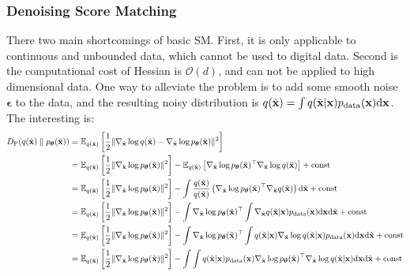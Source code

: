 \documentclass{article}
\begin{document}
\subsubsection{Denoising Score Matching}
There two main shortcomings of basic SM. First, it is only applicable to continuous and unbounded data, which cannot be used to digital data. Second is the computational cost of Hessian is $\mathcal{O}(d)$, and can not be applied to high dimensional data. One way to alleviate the problem is to add some smooth noise $\bm\epsilon$ to the data, and the resulting noisy distribution is $q(\tilde {{\mathbf{x}}}) = \int q(\tilde {{\mathbf{x}}} | {\mathbf{x}})p_{\rm{data}}({\mathbf{x}}) \mathrm{d}{\mathbf{x}}$. The interesting is:
\begin{equation}\label{eq.DSMFisher}
    \begin{aligned}
        \Fisher(q(\tilde{\rvx})\parallel p_\vtheta(\tilde{\rvx}))
        &= \E_{q(\tilde{\rvx})}\left[ \frac{1}{2} \| \nabla_{\tilde{\rvx}}\log q(\tilde{\rvx}) - \nabla_{\tilde{\rvx}}\log p_\vtheta(\tilde{\rvx}) \|^2 \right] \\
        &= \E_{q(\tilde\rvx)}\left[ \frac{1}{2}\| \nabla_{\tilde{\rvx}}\log p_\vtheta(\tilde{\rvx}) \|^2\right] 
        - \E_{q(\tilde{\rvx})}\left[ \nabla_{\tilde{\rvx}}\log p_\vtheta(\tilde{\rvx})^\top \nabla_{\tilde{\rvx}}\log q(\tilde{\rvx})\right] + \text{const}\\
        &= \E_{q(\tilde\rvx)}\left[ \frac{1}{2}\| \nabla_{\tilde{\rvx}}\log p_\vtheta(\tilde{\rvx}) \|^2\right] - 
        \int \frac{q(\tilde{\rvx})}{q(\tilde{\rvx})}\left( \nabla_{\tilde{\rvx}}\log p_\vtheta(\tilde{\rvx})^\top \nabla_{\tilde{\rvx}}q(\tilde{\rvx}) \right)\d\tilde{\rvx} + \text{const}\\
        &= \E_{q(\tilde\rvx)}\left[ \frac{1}{2}\| \nabla_{\tilde{\rvx}}\log p_\vtheta(\tilde{\rvx}) \|^2\right] - 
        \int \nabla_{\tilde{\rvx}}\log p_\vtheta(\tilde{\rvx})^\top \int \nabla_{\tilde{\rvx}}q(\tilde{\rvx}|\rvx)\pdata(\rvx)\d\rvx\d\tilde{\rvx} + \text{const}\\
        &= \E_{q(\tilde\rvx)}\left[ \frac{1}{2}\| \nabla_{\tilde{\rvx}}\log p_\vtheta(\tilde{\rvx}) \|^2\right] - 
        \int \nabla_{\tilde{\rvx}}\log p_\vtheta(\tilde{\rvx})^\top \int q(\tilde{\rvx}|\rvx)\nabla_{\tilde{\rvx}}\log q(\tilde{\rvx}|\rvx)\pdata(\rvx)\d\rvx\d\tilde{\rvx} + \text{const}\\
        &= \E_{q(\tilde\rvx)}\left[ \frac{1}{2}\| \nabla_{\tilde{\rvx}}\log p_\vtheta(\tilde{\rvx}) \|^2\right] - 
        \int \int q(\tilde{\rvx}|\rvx)\pdata(\rvx)\nabla_{\tilde{\rvx}}\log p_\vtheta(\tilde{\rvx})^\top\nabla_{\tilde{\rvx}}\log q(\tilde{\rvx}|\rvx)\d\rvx\d\tilde{\rvx} + \text{const}\\

\end{aligned}
\end{equation}
\end{document}
